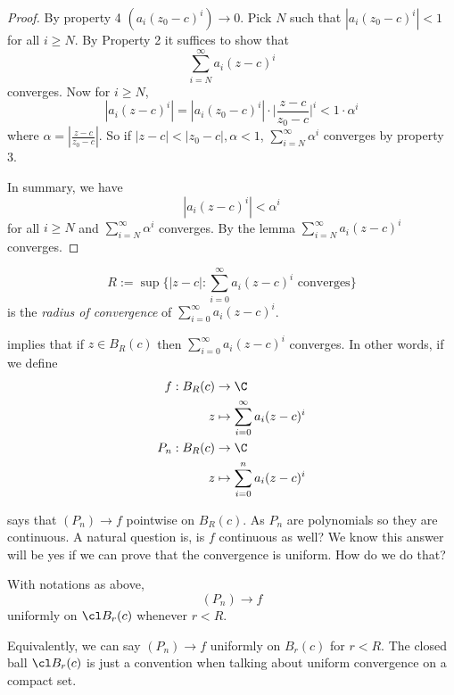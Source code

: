 \documentclass[a4paper]{article}
\theoremstyle{definition}
\begin{document}
\begin{proof}
  By property 4 \((a_i(z_0-c)^i)\to 0\). Pick \(N\) such that \(|a_i(z_0-c)^i|<1\) for all \(i\geq N\). By Property 2 it suffices to show that
  \[
    \sum_{i=N}^{\infty}a_i(z-c)^i
  \]
  converges. Now for \(i\geq N\),
  \[
    \label{eqn:fundamental est}
    \boxed{
    |a_i(z-c)^i| = |a_i(z_0-c)^i| \cdot \Big| \frac{z-c}{z_0-c} \Big|^i < 1\cdot \alpha^i
    }
    \tag*{Fundamental Estimate for Power Series}
    \]
  where \(\alpha = |\frac{z-c}{z_0-c}|\). So if \(|z-c| < |z_0-c|,\alpha<1\), \(\sum_{i=N}^{\infty}\alpha^i \) converges by property 3.

  In summary, we have
  \[
|a_i(z-c)^i| < \alpha^i
\]
for all \(i\geq N\) and \(\sum_{i=N}^{\infty}\alpha^i \) converges. By the lemma \(\sum_{i=N}^{\infty}a_i(z-c)^i \) converges.
\end{proof}

\begin{definition}
  \[
    R := \sup \{ |z-c|: \sum_{i=0}^{\infty}a_i (z-c)^i \text{ converges}\}
  \]
  is the \emph{radius of convergence} of \(\sum_{i=0}^{\infty}a_i(z-c)^i \).
\end{definition}

 implies that if \(z\in B_R(c)\) then \(\sum_{i=0}^{\infty}a_i(z-c)^i \) converges. In other words, if we define
\begin{align*}
  f: B_R(c) &\to \C \\
  z &\mapsto \sum_{i=0}^{\infty} a_i(z-c)^i \\
  P_n: B_R(c) &\to \C \\
  z &\mapsto \sum_{i=0}^{n} a_i(z-c)^i
\end{align*}

 says that \((P_n)\to f\) pointwise on \(B_R(c)\). As \(P_n\) are polynomials so they are continuous. A natural question is, is \(f\) continuous as well? We know this answer will be yes if we can prove that the convergence is uniform. How do we do that?

\begin{theorem}
  With notations as above,
  \[
(P_n)\to f
\]
uniformly on \(\cl B_r(c)\) whenever \(r<R\).
\end{theorem}

\begin{note}
  Equivalently, we can say \((P_n)\to f\) uniformly on \(B_r(c)\) for \(r<R\). The closed ball \(\cl B_r(c)\) is just a convention when talking about uniform convergence on a compact set.
\end{note}
\end{document}
